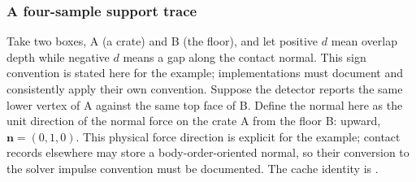 \subsubsection{A four-sample support trace}\label{06-engine-ii-ch033-a-four-sample-support-trace}

\hypertarget{06-engine-ii-ch033-a-four-sample-support-trace}{}

Take two boxes, A (a crate) and B (the floor), and let positive \(d\) mean overlap depth while negative \(d\) means a gap along the contact normal. This sign convention is stated here for the example; implementations must document and consistently apply their own convention. Suppose the detector reports the same lower vertex of A against the same top face of B. Define the normal here as the unit direction of the normal force on the crate A from the floor B: upward, \(\mathbf n=(0,1,0)\). This physical force direction is explicit for the example; contact records elsewhere may store a body-order-oriented normal, so their conversion to the solver impulse convention must be documented. The cache identity is .

